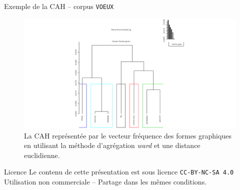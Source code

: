 \documentclass[xetex,xcolor={table,usenames,dvipsnames}]{beamer}
\begin{document}
\begin{frame}{Exemple de la \textsc{CAH} -- corpus \texttt{VOEUX}}
			\begin{figure}[h] %
		\centering
		\includegraphics[width=1\linewidth]{img/cah.png}
		\caption{La \textsc{CAH} représentée par le vecteur fréquence des formes graphiques en utilisant la méthode d’agrégation \textit{ward} et une distance euclidienne.}
		\label{fig:ling_out_TAL}
	\end{figure}
\end{frame}
\begin{frame}[allowframebreaks]
		\printbibliography
\end{frame}

\begin{frame}{Licence}
	\centering
	{\small Le contenu de cette présentation est sous licence \texttt{CC-BY-NC-SA 4.0}\\Utilisation non commerciale -- Partage dans les mêmes conditions.\\}
	\href{https://creativecommons.org/licenses/by-nc-sa/4.0/deed.fr}{\ccbyncsa}
\end{frame}
\end{document}
